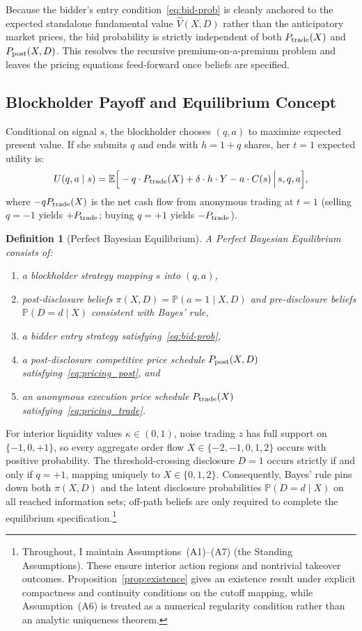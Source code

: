 \documentclass[11pt]{article}
\newtheorem{definition}{Definition}
\newcommand{\E}{\mathbb{E}}
\newcommand{\PP}{\mathbb{P}}
\newcommand{\1}{\mathbf{1}}
\begin{document}
Because the bidder's entry condition~\eqref{eq:bid-prob} is cleanly anchored to the expected standalone fundamental value $\hat{V}(X,D)$ rather than the anticipatory market prices, the bid probability is strictly independent of both $P_{\textup{trade}}(X)$ and $P_{\textup{post}}(X,D)$. This resolves the recursive premium-on-a-premium problem and leaves the pricing equations feed-forward once beliefs are specified.

%
\subsection{Blockholder Payoff and Equilibrium Concept}

Conditional on signal $s$, the blockholder chooses $(q, a)$ to maximize expected present value. If she submits $q$ and ends with $h = 1 + q$ shares, her $t = 1$ expected utility is:
\[
U(q, a \mid s) = \E\Big[-q \cdot P_{\textup{trade}}(X) + \delta \cdot h \cdot Y - a \cdot C(s) \,\Big|\, s, q, a\Big],
\]
where $-qP_{\textup{trade}}(X)$ is the net cash flow from anonymous trading at $t = 1$ (selling $q = -1$ yields $+P_{\textup{trade}}$; buying $q = +1$ yields $-P_{\textup{trade}}$).

\begin{definition}[Perfect Bayesian Equilibrium]
A \emph{Perfect Bayesian Equilibrium} consists of:
\begin{enumerate}[label=(\roman{enumi})]
\item a blockholder strategy mapping $s$ into $(q, a)$,
\item post-disclosure beliefs $\pi(X,D) = \PP(a = 1 \mid X, D)$ and pre-disclosure beliefs $\PP(D=d \mid X)$ consistent with Bayes' rule,
\item a bidder entry strategy satisfying~\eqref{eq:bid-prob},
\item a post-disclosure competitive price schedule $P_{\textup{post}}(X,D)$ satisfying~\eqref{eq:pricing_post}, and
\item an anonymous execution price schedule $P_{\textup{trade}}(X)$ satisfying~\eqref{eq:pricing_trade}.
\end{enumerate}
\end{definition}

For interior liquidity values $\kappa \in (0,1)$, noise trading $z$ has full support on $\{-1,0,+1\}$, so every aggregate order flow $X \in \{-2,-1,0,1,2\}$ occurs with positive probability. The threshold-crossing disclosure $D=1$ occurs strictly if and only if $q=+1$, mapping uniquely to $X \in \{0,1,2\}$. Consequently, Bayes' rule pins down both $\pi(X,D)$ and the latent disclosure probabilities $\PP(D=d \mid X)$ on all reached information sets; off-path beliefs are only required to complete the equilibrium specification.\footnote{Throughout, I maintain Assumptions~\textup{(A1)}--\textup{(A7)} (the Standing Assumptions). These ensure interior action regions and nontrivial takeover outcomes. Proposition~\ref{prop:existence} gives an existence result under explicit compactness and continuity conditions on the cutoff mapping, while Assumption~\textup{(A6)} is treated as a numerical regularity condition rather than an analytic uniqueness theorem.}
\end{document}
